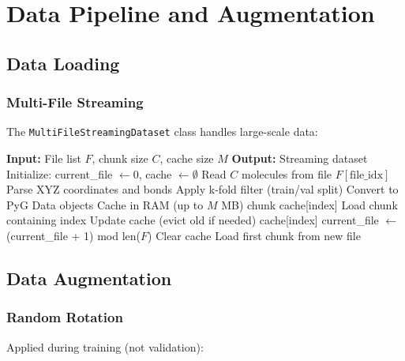 \documentclass[11pt,a4paper]{article}
\begin{document}
\clearpage

\section{Data Pipeline and Augmentation}

\subsection{Data Loading}

\subsubsection{Multi-File Streaming}

The \texttt{MultiFileStreamingDataset} class handles large-scale data:

\begin{algorithm}
\caption{Multi-File Streaming Dataset}
\begin{algorithmic}[1]
\State \textbf{Input:} File list $F$, chunk size $C$, cache size $M$
\State \textbf{Output:} Streaming dataset
\State
\State Initialize: current\_file $\gets 0$, cache $\gets \emptyset$
\State
{}
    \State Read $C$ molecules from file $F[\text{file\_idx}]$
    \State Parse XYZ coordinates and bonds
    \State Apply k-fold filter (train/val split)
    \State Convert to PyG Data objects
    \State Cache in RAM (up to $M$ MB)
    \State \Return chunk
\EndFunction
\State
{}
        \State \Return cache[index]
    \Else
        \State Load chunk containing index
        \State Update cache (evict old if needed)
        \State \Return cache[index]
    \EndIf
\EndFunction
\State
{}
    \State current\_file $\gets$ (current\_file + 1) mod len($F$)
    \State Clear cache
    \State Load first chunk from new file
\EndFunction
\end{algorithmic}
\end{algorithm}

\subsection{Data Augmentation}

\subsubsection{Random Rotation}

Applied during training (not validation):
\end{document}
